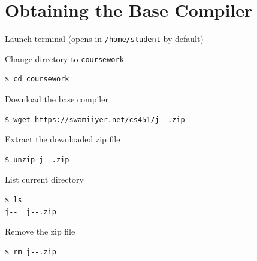 \documentclass[8pt,a4paper,compress]{beamer}
\begin{document}
\section{Obtaining the Base \protect \jmm Compiler}
\begin{frame}[fragile]
\pause

Launch terminal (opens in \lstinline{/home/student} by default)

\pause\bigskip

Change directory to \lstinline{coursework}

\begin{tcolorbox}[enhanced,drop shadow southwest,sharp corners,size=fbox,colback=black]
\begin{lstlisting}[style=terminal]
$ cd coursework
\end{lstlisting}
\end{tcolorbox}

\pause\bigskip

Download the base \jmm compiler

\begin{tcolorbox}[enhanced,drop shadow southwest,sharp corners,size=fbox,colback=black]
\begin{lstlisting}[style=terminal]
$ wget https://swamiiyer.net/cs451/j--.zip
\end{lstlisting}
\end{tcolorbox}

\pause\bigskip

Extract the downloaded zip file

\begin{tcolorbox}[enhanced,drop shadow southwest,sharp corners,size=fbox,colback=black]
\begin{lstlisting}[style=terminal]
$ unzip j--.zip
\end{lstlisting}
\end{tcolorbox}

\pause\bigskip

List current directory

\begin{tcolorbox}[enhanced,drop shadow southwest,sharp corners,size=fbox,colback=black]
\begin{lstlisting}[style=terminal]
$ ls
j--  j--.zip
\end{lstlisting}
\end{tcolorbox}

\pause\bigskip

Remove the zip file

\begin{tcolorbox}[enhanced,drop shadow southwest,sharp corners,size=fbox,colback=black]
\begin{lstlisting}[style=terminal]
$ rm j--.zip
\end{lstlisting}
\end{tcolorbox}
\end{frame}
\end{document}
